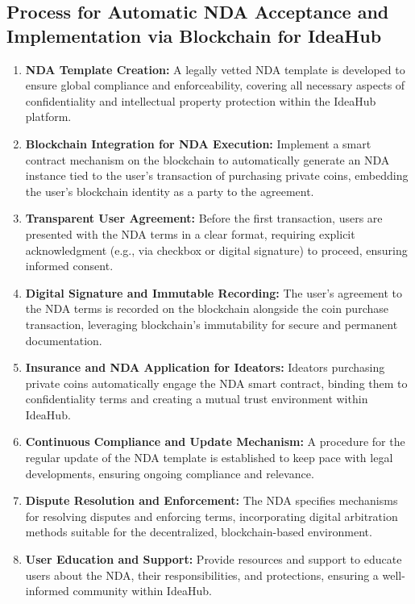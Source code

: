 \documentclass{article}
\begin{document}
	\subsection{Process for Automatic NDA Acceptance and Implementation via Blockchain for IdeaHub}
	
	\begin{enumerate}
		\item \textbf{NDA Template Creation:} A legally vetted NDA template is developed to ensure global compliance and enforceability, covering all necessary aspects of confidentiality and intellectual property protection within the IdeaHub platform.
		
		\item \textbf{Blockchain Integration for NDA Execution:} Implement a smart contract mechanism on the blockchain to automatically generate an NDA instance tied to the user's transaction of purchasing private coins, embedding the user's blockchain identity as a party to the agreement.
		
		\item \textbf{Transparent User Agreement:} Before the first transaction, users are presented with the NDA terms in a clear format, requiring explicit acknowledgment (e.g., via checkbox or digital signature) to proceed, ensuring informed consent.
		
		\item \textbf{Digital Signature and Immutable Recording:} The user's agreement to the NDA terms is recorded on the blockchain alongside the coin purchase transaction, leveraging blockchain's immutability for secure and permanent documentation.
		
		\item \textbf{Insurance and NDA Application for Ideators:} Ideators purchasing private coins automatically engage the NDA smart contract, binding them to confidentiality terms and creating a mutual trust environment within IdeaHub.
		
		\item \textbf{Continuous Compliance and Update Mechanism:} A procedure for the regular update of the NDA template is established to keep pace with legal developments, ensuring ongoing compliance and relevance.
		
		\item \textbf{Dispute Resolution and Enforcement:} The NDA specifies mechanisms for resolving disputes and enforcing terms, incorporating digital arbitration methods suitable for the decentralized, blockchain-based environment.
		
		\item \textbf{User Education and Support:} Provide resources and support to educate users about the NDA, their responsibilities, and protections, ensuring a well-informed community within IdeaHub.
	\end{enumerate}
	
\end{document}
